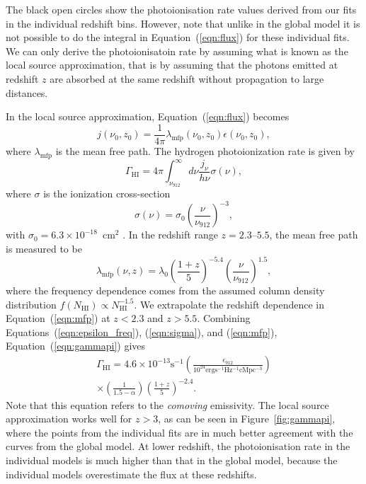 \documentclass[a4paper,fleqn,usenatbib]{mnras}
\begin{document}
The black open circles show the photoionisation rate values derived
from our fits in the individual redshift bins.  However, note that
unlike in the global model it is not possible to do the integral in
Equation~(\ref{eqn:flux}) for these individual fits.  We can only
derive the photoionisatoin rate by assuming what is known as the local
source approximation, that is by assuming that the photons emitted at
redshift $z$ are absorbed at the same redshift without propagation to
large distances.

In the local source approximation, Equation~(\ref{eqn:flux}) becomes
\begin{equation}
  j(\nu_0, z_0) = \frac{1}{4\pi}\lambda_\mathrm{mfp}(\nu_0, z_0)\epsilon(\nu_0, z_0),
\end{equation}
where $\lambda_\mathrm{mfp}$ is the mean free path.  The hydrogen
photoionization rate is given by
\begin{equation}
  \Gamma_\mathrm{HI}=4\pi\int_{\nu_{912}}^\infty d\nu \frac{j_\nu}{h\nu} \sigma(\nu),
  \label{eqn:gammapi}
\end{equation}
where $\sigma$ is the ionization cross-section
\begin{equation}
  \sigma(\nu) = \sigma_0\left(\frac{\nu}{\nu_{912}}\right)^{-3},
  \label{eqn:sigma}
\end{equation}
with $\sigma_0=6.3\times 10^{-18}$~cm$^2$ \citep{2006agna.book.....O}.
In the redshift range $z=2.3$--$5.5$, the mean free path is measured
to be \citep{2014MNRAS.445.1745W}
\begin{equation}
  \lambda_\mathrm{mfp}(\nu, z)= \lambda_0\left(\frac{1+z}{5}\right)^{-5.4}\left(\frac{\nu}{\nu_{912}}\right)^{1.5},
  \label{eqn:mfp}
\end{equation}
where the frequency dependence comes from the assumed column density
distribution $f(N_\mathrm{HI})\propto N_\mathrm{HI}^{-1.5}$.  We
extrapolate the redshift dependence in Equation~(\ref{eqn:mfp}) at
$z<2.3$ and $z>5.5$.  Combining Equations~(\ref{eqn:epsilon_freq}),
(\ref{eqn:sigma}), and (\ref{eqn:mfp}), Equation~(\ref{eqn:gammapi})
gives
\begin{multline}
  \Gamma_\mathrm{HI}=4.6\times 10^{-13} \mathrm{s}^{-1} \left(\frac{\epsilon_{912}}{10^{24}\mathrm{erg s^{-1} Hz^{-1} cMpc^{-3}}}\right)\\
  \times\left(\frac{1}{1.5-\alpha}\right)\left(\frac{1+z}{5}\right)^{-2.4}.
\end{multline}
Note that this equation refers to the \emph{comoving} emissivity.  The
local source approximation works well for $z>3$, as can be seen in
Figure~\ref{fig:gammapi}, where the points from the individual fits
are in much better agreement with the curves from the global model.
At lower redshift, the photoionisation rate in the individual models
is much higher than that in the global model, because the individual
models overestimate the flux at these redshifts. 
\end{document}
